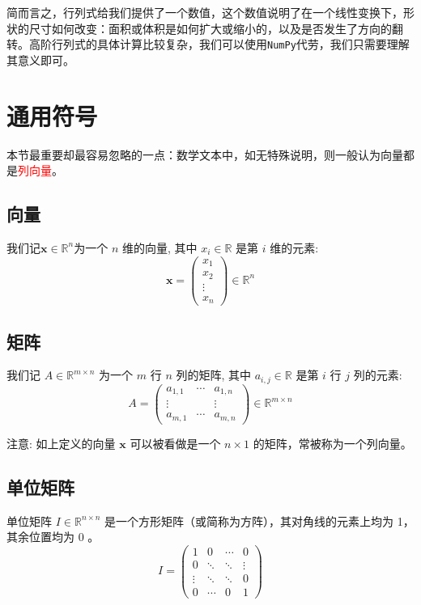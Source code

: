 简而言之，行列式给我们提供了一个数值，这个数值说明了在一个线性变换下，形状的尺寸如何改变：面积或体积是如何扩大或缩小的，以及是否发生了方向的翻转。高阶行列式的具体计算比较复杂，我们可以使用\texttt{NumPy}代劳，我们只需要理解其意义即可。

\section{通用符号}

\begin{note}
    本节最重要却最容易忽略的一点：数学文本中，如无特殊说明，则一般认为向量都是\textcolor{red}{列向量}。
\end{note}

\subsection{向量}
我们记$\boldsymbol{x}\in \mathbb{R}^n$为一个 $n$ 维的向量, 其中 $x_i \in \mathbb{R}$ 是第 $i$ 维的元素:
$$
\boldsymbol{x}=\left(\begin{array}{c}
x_1 \\
x_2 \\
\vdots \\
x_n
\end{array}\right) \in \mathbb{R}^n
$$

\subsection{矩阵}
我们记 $A \in \mathbb{R}^{m \times n}$ 为一个 $m$ 行 $n$ 列的矩阵, 其中 $a_{i, j} \in \mathbb{R}$ 是第 $i$ 行 $j$ 列的元素:
$$
A=\left(\begin{array}{ccc}
a_{1,1} & \cdots & a_{1, n} \\
\vdots & & \vdots \\
a_{m, 1} & \cdots & a_{m, n}
\end{array}\right) \in \mathbb{R}^{m \times n}
$$

注意: 如上定义的向量 $\boldsymbol{x}$ 可以被看做是一个 $n \times 1$ 的矩阵，常被称为一个列向量。


\subsection{单位矩阵}

单位矩阵 $I \in \mathbb{R}^{n \times n}$ 是一个方形矩阵（或简称为方阵），其对角线的元素上均为 1， 其余位置均为 0 。
$$
I=\left(\begin{array}{cccc}
1 & 0 & \cdots & 0 \\
0 & \ddots & \ddots & \vdots \\
\vdots & \ddots & \ddots & 0 \\
0 & \cdots & 0 & 1
\end{array}\right)
$$

